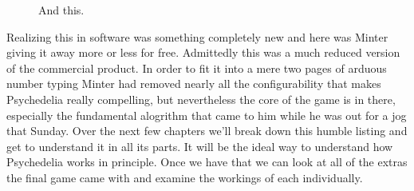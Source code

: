 \begin{figure}[H]
    \centering
    \begin{adjustbox}{width=12cm,center}
    \end{adjustbox}
\caption{And this.}
\end{figure}

Realizing this in software was something completely new and here was Minter giving it away more or less for free. Admittedly this was
a much reduced version of the commercial product. In order to fit it into a mere two pages of arduous number typing Minter had removed
nearly all the configurability that makes Psychedelia really compelling, but nevertheless the core of the game is in there, especially
the fundamental alogrithm that came to him while he was out for a jog that Sunday. Over the next few chapters we'll break down this
humble listing and get to understand it in all its parts. It will be the ideal way to understand how Psychedelia works in principle.
Once we have that we can look at all of the extras the final game came with and examine the workings of each individually.

